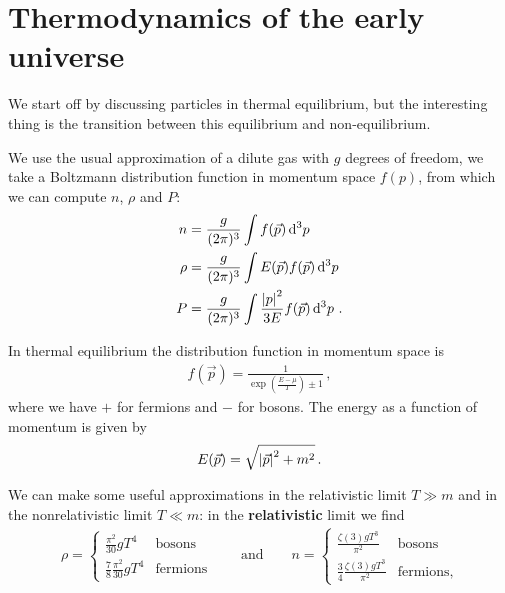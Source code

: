 \documentclass[main.tex]{subfiles}
\begin{document}
\section{Thermodynamics of the early universe}


We start off by discussing particles in thermal equilibrium, but the interesting thing is the transition between this equilibrium and non-equilibrium.

We use the usual approximation of a dilute gas with \(g\) degrees of freedom, we take a Boltzmann distribution function in momentum space \(f(p)\), from which we can compute \(n\), \(\rho \) and \(P\): 
%
\begin{align}
n &= \frac{g}{(2\pi )^3} \int f(\vec{p}) \dd[3]{p} \\
\rho  &= \frac{g}{(2\pi )^3} \int E(\vec{p}) f(\vec{p}) \dd[3]{p} \\
P  &= \frac{g}{(2\pi )^3} \int \frac{\abs{p}^2}{3E} f(\vec{p}) \dd[3]{p} 
\,.
\end{align}

In thermal equilibrium the distribution function in momentum space is 
%
\begin{align}
f(\vec{p}) = \frac{1}{\exp(\frac{E-\mu }{T}) \pm 1}
\,,
\end{align}
%
where we have \(+\) for fermions and \(-\) for bosons.
The energy as a function of momentum is given by 
%
\begin{align}
E(\vec{p}) = \sqrt{\abs{\vec{p}}^2 + m^2}
\,.
\end{align}

We can make some useful approximations in the relativistic limit \(T \gg m\) and in the nonrelativistic limit \(T \ll m\): 
in the \textbf{relativistic} limit we find 
%
\begin{align}
\rho = 
\begin{cases}
  \displaystyle \frac{\pi^2}{30 } g T^{4} &  \text{bosons} \\
  \displaystyle \frac{7}{8} \frac{\pi^2}{30 } g T^{4} &  \text{fermions}
\end{cases}
\qquad \text{and} \qquad
n = 
\begin{cases}
  \displaystyle \frac{\zeta (3) g T^{3}}{\pi^2} &  \text{bosons} \\
  \displaystyle \frac{3}{4}\frac{\zeta (3) g T^{3}}{\pi^2} &  \text{fermions},
\end{cases}
\end{align}
\end{document}
